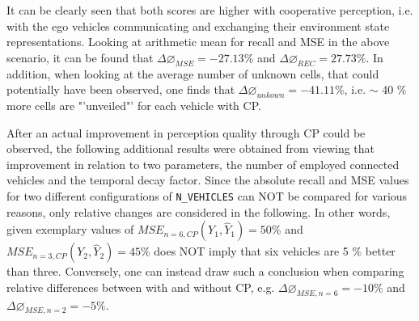 It can be clearly seen that both scores are higher with cooperative perception, i.e. with the ego vehicles communicating and exchanging their environment state representations. Looking at arithmetic mean for recall and MSE in the above scenario, it can be found that $\Delta \diameter_{MSE} = -27.13 \%$ and $\Delta \diameter_{REC} = 27.73 \%$. In addition, when looking at the average number of unknown cells, that could potentially have been observed, one finds that $\Delta \diameter_{unkown} = -41.11 \%$, i.e. $\sim$ 40 \% more cells are "'unveiled"' for each vehicle with CP.
\par
\bigskip

After an actual improvement in perception quality through CP could be observed, the following additional results were obtained from viewing that improvement in relation to two parameters, the number of employed connected vehicles and the temporal decay factor. Since the absolute recall and MSE values for two different configurations of \texttt{N\_VEHICLES} can NOT be compared for various reasons, only relative changes are considered in the following. In other words, given exemplary values of $\textit{MSE}_{n=6, CP}(Y_1, \hat{Y}_1) = 50 \%$ and $\textit{MSE}_{n=3, CP}(Y_2, \hat{Y}_2) = 45 \%$ does NOT imply that six vehicles are 5 \% better than three. Conversely, one can instead draw such a conclusion when comparing relative differences between with and without CP, e.g. $\Delta \diameter_{MSE,n=6} = -10 \%$ and $\Delta \diameter_{MSE,n=2} = -5 \%$.

